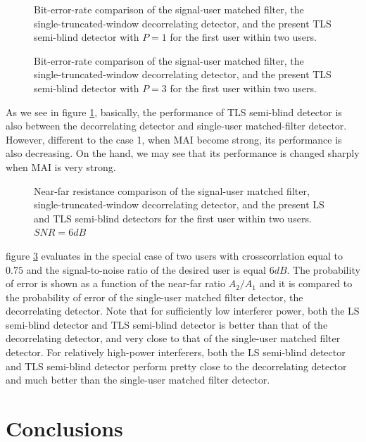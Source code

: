\documentclass[a4paper,11pt,fleqn]{article}
\begin{document}
\begin{figure}
\caption{Bit-error-rate comparison of the signal-user matched
filter, the single-truncated-window decorrelating detector, and
the present TLS semi-blind detector with $P=1$ for the first user
within two users.} \label{TLS1_2}
\end{figure}


\begin{figure}
\caption{Bit-error-rate comparison of the signal-user matched
filter, the single-truncated-window decorrelating detector, and
the present TLS semi-blind detector with $P=3$ for the first user
within two users.} \label{TLS2_2}
\end{figure}

As we see in figure \ref{TLS1_2}, basically, the performance of
TLS semi-blind detector is also between the decorrelating detector
and single-user matched-filter detector. However, different to the
case 1, when MAI become strong, its performance is also
decreasing. On the hand, we may see that its performance is
changed sharply when MAI is very strong.

\begin{figure}
\caption{Near-far resistance comparison of the signal-user matched
filter, single-truncated-window decorrelating detector, and the
present LS and TLS semi-blind detectors for the first user within
two users. $SNR=6dB$} \label{NFR_2}
\end{figure}

figure \ref{NFR_2} evaluates in the special case of two users with
crosscorrlation equal to $0.75$ and the signal-to-noise ratio of
the desired user is equal $6dB$. The probability of error is shown
as a function of the near-far ratio $A_2/A_1$ and it is compared
to the probability of error of the single-user matched filter
detector, the decorrelating detector. Note that for sufficiently
low interferer power, both the LS semi-blind detector and TLS
semi-blind detector is better than that of the decorrelating
detector, and very close to that of the single-user matched filter
detector. For relatively high-power interferers, both the LS
semi-blind detector and TLS semi-blind detector perform pretty
close to the decorrelating detector and much better than the
single-user matched filter detector.

\section{Conclusions}
\end{document}
